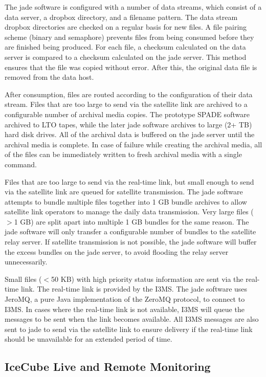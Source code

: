 The jade software is configured with a number of data streams, which consist of a data server, a dropbox directory, and a filename pattern.
The data stream dropbox directories are checked on a regular basis for new files. A file pairing scheme (binary and semaphore) prevents files
from being consumed before they are finished being produced. For each file, a checksum calculated on the data server is compared to a checksum
calculated on the jade server. This method ensures that the file was copied without error. After this, the original data file is removed from the data host.

After consumption, files are routed according to the configuration of their data stream. Files that are too large to send via the satellite link are archived to
a configurable number of archival media copies. The prototype SPADE software archived to LTO tapes, while the later jade software archives to large (2+ TB) hard
disk drives. All of the archival data is buffered on the jade server until the archival media is complete. In case of failure while creating the archival media,
all of the files can be immediately written to fresh archival media with a single command.

Files that are too large to send via the real-time link, but small enough to send via the satellite link are queued for satellite transmission. The jade software
attempts to bundle multiple files together into 1 GB bundle archives to allow satellite link operators to manage the daily data transmission. Very large files
($>$1 GB) are split apart into multiple 1 GB bundles for the same reason. The jade software will only transfer a configurable number of bundles to the satellite
relay server. If satellite transmission is not possible, the jade software will buffer the excess bundles on the jade server, to avoid flooding the relay server
unnecessarily.


Small files ($<$50 KB) with high priority status information are sent
via the real-time link. The real-time link is provided by the I3MS. The jade software uses JeroMQ, a pure Java implementation of the ZeroMQ protocol, to connect to I3MS. In cases where the real-time link is not
available, I3MS will queue the messages to be sent when the link becomes available. All I3MS messages are also sent to jade to send via the satellite link to
ensure delivery if the real-time link should be unavailable for an extended period of time.

\subsection{\label{sec:online:icecubelive}IceCube Live and Remote Monitoring}

